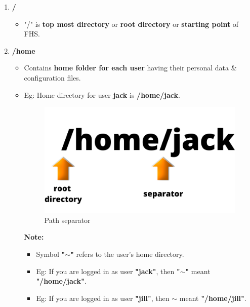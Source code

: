 
\begin{flushleft}
	\begin{enumerate}
		\item \textbf{/} 
		\begin{itemize}
			\item "/" is \textbf{top most directory} or \textbf{root directory} or \textbf{starting point} of FHS. 
		\end{itemize}
		\item \textbf{/home}
		\begin{itemize}
			\item Contains \textbf{home folder for each user} having their personal data \& configuration files.
			\item Eg: Home directory for user \textbf{jack} is \textbf{/home/jack}.
			\begin{figure}[h!]
				\centering
				\includegraphics[scale=.3]{content/chapter2/images/path.png}
				\caption{Path separator}
				\label{fig:path}
			\end{figure}
			\begin{tcolorbox}[breakable,notitle,boxrule=-0pt,colback=yellow,colframe=yellow]
				\color{black}
				\textbf{Note:}
				\begin{itemize}
					\item Symbol \textbf{"$\sim$"} refers to the user's home directory.
					\item Eg: If you are logged in as user \textbf{"jack"}, then \textbf{"$\sim$"} meant \textbf{"/home/jack"}.
					\item Eg: If you are logged in as user \textbf{"jill"}, then \textbf{$\sim$} meant \textbf{"/home/jill"}.
					\end{itemize}
			\end{tcolorbox}
			

\end{itemize}
\end{enumerate}
\end{flushleft}
